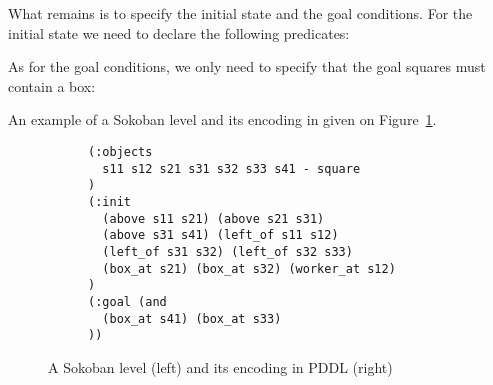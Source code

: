 \documentclass[runningheads]{llncs}
\begin{document}
What remains is to specify the initial state and the goal conditions. For the initial state we need to declare
the following predicates:
As for the goal conditions, we only need to specify that the goal squares must contain a box:
An example of a Sokoban level and its encoding in given on Figure~\ref{fig-solve-example}.

\begin{figure}
\begin{subfigure}[b]{0.35\textwidth}
\centering
\w\w\w\w\e\n
\w\e\p\w\e\n
\w\x\w\w\w\n
\w\e\x\g\w\n
\w\g\w\w\w\n
\w\w\w\e\e\n
\vspace{1em}
\end{subfigure}
\begin{subfigure}[b]{0.65\textwidth}
\begin{verbatim}
(:objects
  s11 s12 s21 s31 s32 s33 s41 - square
)
(:init
  (above s11 s21) (above s21 s31)
  (above s31 s41) (left_of s11 s12)
  (left_of s31 s32) (left_of s32 s33)
  (box_at s21) (box_at s32) (worker_at s12)
)
(:goal (and
  (box_at s41) (box_at s33)
))
\end{verbatim}

\end{subfigure}
\caption{A Sokoban level (left) and its encoding in PDDL (right)}
\label{fig-solve-example}
\end{figure}
\end{document}
